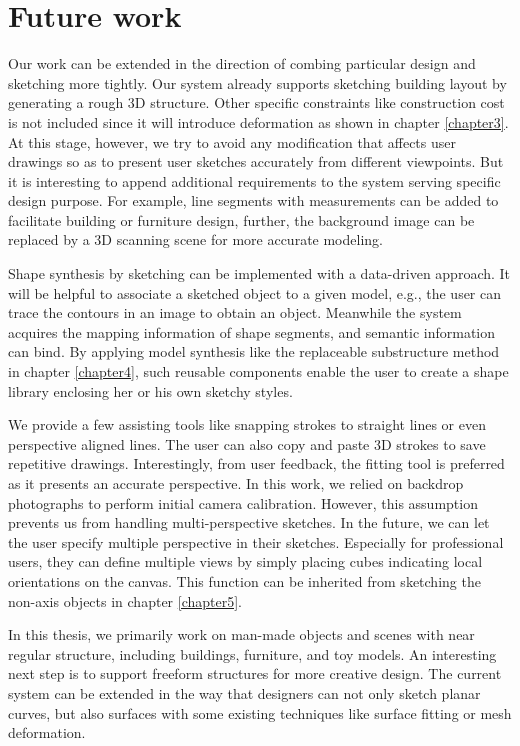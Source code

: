 \section{Future work}
\label{sec:future}

Our work can be extended in the direction of combing particular design and sketching more tightly. Our system already supports sketching building layout by generating a rough 3D structure. Other specific constraints like construction cost is not included since it will introduce deformation as shown in chapter \ref{chapter3}. At this stage, however, we try to avoid any modification that affects user drawings so as to present user sketches accurately from different viewpoints. But it is interesting to append additional requirements to the system serving specific design purpose. For example, line segments with measurements can be added to facilitate building or furniture design, further, the background image can be replaced by a 3D scanning scene for more accurate modeling.

Shape synthesis by sketching can be implemented with a data-driven approach. It will be helpful to associate a sketched object to a given model, e.g., the user can trace the contours in an image to obtain an object. Meanwhile the system acquires the mapping information of shape segments, and semantic information can bind. By applying model synthesis like the replaceable substructure method in chapter \ref{chapter4}, such reusable components enable the user to create a shape library enclosing her or his own sketchy styles.

We provide a few assisting tools like snapping strokes to straight lines or even perspective aligned lines. The user can also copy and paste 3D strokes to save repetitive drawings. Interestingly, from user feedback, the fitting tool is preferred as it presents an accurate perspective. In this work, we relied on backdrop photographs to perform initial camera calibration. However, this assumption prevents us from handling multi-perspective sketches. In the future, we can let the user specify multiple perspective in their sketches. Especially for professional users, they can define multiple views by simply placing cubes indicating local orientations on the canvas. This function can be inherited from sketching the non-axis objects in chapter \ref{chapter5}.

In this thesis, we primarily work on man-made objects and scenes with near regular structure, including buildings, furniture, and toy models. An interesting next step is to support freeform structures for more creative design. The current system can be extended in the way that designers can not only sketch planar curves, but also surfaces with some existing techniques like surface fitting or mesh deformation.
